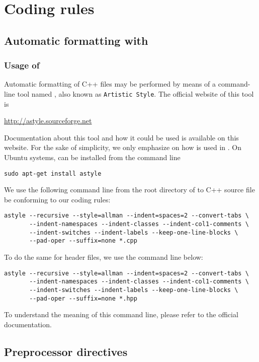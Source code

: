 


\chapter{Coding rules}


\section{Automatic formatting with \Astyle}

\subsection{Usage of \Astyle}

Automatic formatting of C++ files may be performed by means of a command-line tool named \Astyle, also known as \texttt{Artistic Style}. The official website of this tool is 
\begin{center}
\url{http://astyle.sourceforge.net}
\end{center}
Documentation about this tool and how it could be used is available on this website. For the sake of simplicity, we only emphasize on how \Astyle is used in \Simol. On Ubuntu systems, \Astyle can be installed from the command line
\begin{verbatim}
sudo apt-get install astyle
\end{verbatim}
We use the following command line from the root directory of \Simol to C++ source file be conforming to our coding rules:
\begin{verbatim}
astyle --recursive --style=allman --indent=spaces=2 --convert-tabs \
       --indent-namespaces --indent-classes --indent-col1-comments \
       --indent-switches --indent-labels --keep-one-line-blocks \
       --pad-oper --suffix=none *.cpp
\end{verbatim}
To do the same for header files, we use the command line below:
\begin{verbatim}
astyle --recursive --style=allman --indent=spaces=2 --convert-tabs \
       --indent-namespaces --indent-classes --indent-col1-comments \
       --indent-switches --indent-labels --keep-one-line-blocks \
       --pad-oper --suffix=none *.hpp
\end{verbatim}
To understand the meaning of this command line, please refer to the official documentation.


\section{Preprocessor directives}


